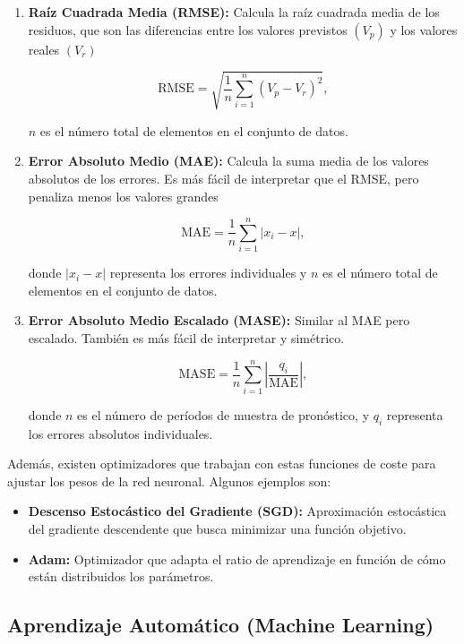 \documentclass[titlepage,11pt]{article}
\begin{document}
		\begin{enumerate}
			\item {\bf Raíz Cuadrada Media (RMSE):} Calcula la raíz cuadrada media de los residuos, que son las diferencias entre los valores previstos $(V_p)$ y los valores reales $(V_r)$ 
			
			$$\text{RMSE} = \sqrt{\frac{1}{n} \sum_{i=1}^{n} (V_p - V_r)^2},$$
			
			$n$ es el número total de elementos en el conjunto de datos.
			
			\item {\bf Error Absoluto Medio (MAE):} Calcula la suma media de los valores absolutos de los errores. Es más fácil de interpretar que el RMSE, pero penaliza menos los valores grandes
			
			$$\text{MAE} = \frac{1}{n} \sum_{i=1}^{n} |x_i - x| ,$$
			
			donde $|x_i - x|$ representa los errores individuales y $n$ es el número total de elementos en el conjunto de datos.
			
			\item {\bf Error Absoluto Medio Escalado (MASE):} Similar al MAE pero escalado. También es más fácil de interpretar y simétrico.
			
			$$\text{MASE} = \frac{1}{n} \sum_{i=1}^{n} \left| \frac{q_i}{\text{MAE}} \right|,$$
			
			donde $n$ es el número de períodos de muestra de pronóstico, y $q_i$ representa los errores absolutos individuales.
		\end{enumerate}
		
		Además, existen optimizadores que trabajan con estas funciones de coste para ajustar los pesos de la red neuronal. Algunos ejemplos son:
		
		\begin{itemize}
			\item {\bf Descenso Estocástico del Gradiente (SGD):} Aproximación estocástica del gradiente descendente que busca minimizar una función objetivo.
			
			\item {\bf Adam:} Optimizador que adapta el ratio de aprendizaje en función de cómo están distribuidos los parámetros.
		\end{itemize}

\subsection{Aprendizaje Automático (Machine Learning)}
\label{subsec:ML}
\end{document}
